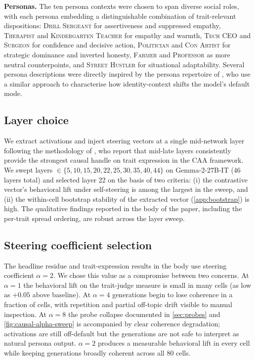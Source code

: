 \documentclass{article}
\theoremstyle{plain}
\theoremstyle{definition}
\theoremstyle{remark}
\begin{document}
\textbf{Personas.} The ten persona contexts were chosen to span diverse social roles, with each persona embedding a distinguishable combination of trait-relevant dispositions: \textsc{Drill Sergeant} for assertiveness and suppressed empathy, \textsc{Therapist} and \textsc{Kindergarten Teacher} for empathy and warmth, \textsc{Tech CEO} and \textsc{Surgeon} for confidence and decisive action, \textsc{Politician} and \textsc{Con Artist} for strategic dominance and inverted honesty, \textsc{Farmer} and \textsc{Professor} as more neutral counterpoints, and \textsc{Street Hustler} for situational adaptability. Several persona descriptions were directly inspired by the persona repertoire of \citet{lu2026assistant}, who use a similar approach to characterise how identity-context shifts the model's default mode.

\subsection{Layer choice}
\label{app:layer-choice}

We extract activations and inject steering vectors at a single mid-network layer following the methodology of \citet{rimsky2024steering}, who report that mid-late layers consistently provide the strongest causal handle on trait expression in the CAA framework. We swept layers $\in \{5, 10, 15, 20, 22, 25, 30, 35, 40, 44\}$ on Gemma-2-27B-IT (46 layers total) and selected layer 22 on the basis of two criteria: (i) the contrastive vector's behavioral lift under self-steering is among the largest in the sweep, and (ii) the within-cell bootstrap stability of the extracted vector (\cref{app:bootstrap}) is high. The qualitative findings reported in the body of the paper, including the per-trait spread ordering, are robust across the layer sweep.

\subsection{Steering coefficient selection}
\label{app:alpha}

The headline residue and trait-expression results in the body use steering coefficient $\alpha = 2$. We chose this value as a compromise between two concerns. At $\alpha = 1$ the behavioral lift on the trait-judge measure is small in many cells (as low as $+0.05$ above baseline). At $\alpha = 4$ generations begin to lose coherence in a fraction of cells, with repetition and partial off-topic drift visible to manual inspection. At $\alpha = 8$ the probe collapse documented in \cref{sec:probes} and \cref{fig:causal-alpha-sweep} is accompanied by clear coherence degradation; activations are still off-default but the generations are not safe to interpret as natural persona output. $\alpha = 2$ produces a measurable behavioral lift in every cell while keeping generations broadly coherent across all 80 cells.
\end{document}
